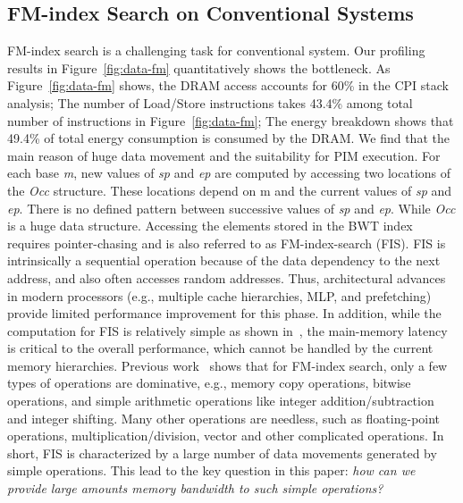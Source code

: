 \documentclass[9pt,conference]{IEEEtran}
\begin{document}
\subsection{FM-index Search on Conventional Systems}
FM-index search is a challenging task for conventional system. Our profiling results in Figure~\ref{fig:data-fm} quantitatively shows the bottleneck. As Figure~\ref{fig:data-fm} shows, the DRAM access accounts for 60\% in the CPI stack analysis; The number of Load/Store instructions takes 43.4\% among total number of instructions in Figure~\ref{fig:data-fm}; The energy breakdown shows that 49.4\% of total energy consumption is consumed by the DRAM. We find that the main reason of huge data movement and the suitability for PIM execution. For each base \textit{m}, new values of \textit{sp} and \textit{ep} are computed by accessing two locations of the \textit{Occ} structure. These locations depend on m and the current values of \textit{sp} and \textit{ep}. There is no defined pattern between successive values of \textit{sp} and \textit{ep}. While \textit{Occ} is a huge data structure. Accessing the elements stored in the BWT index requires pointer-chasing and is also referred to as FM-index-search (FIS). FIS is intrinsically a sequential operation because of the data dependency to the next address, and also often accesses random addresses. Thus, architectural advances in modern processors (e.g., multiple cache hierarchies, MLP, and prefetching) provide limited performance improvement for this phase. In addition, while the computation for FIS is relatively simple as shown in~\cite{yuanrong}, the main-memory latency is critical to the overall performance, which cannot be handled by the current memory hierarchies. Previous work~\cite{yuanrong} shows that for FM-index search, only a few types of operations are dominative, e.g., memory copy operations, bitwise operations, and simple arithmetic operations like integer addition/subtraction and integer shifting. Many other operations are needless, such as floating-point operations, multiplication/division, vector and other complicated operations. In short, FIS is characterized by a large number of data movements generated by simple operations. This lead to the key question in this paper: \textit{how can we provide large amounts memory bandwidth to such simple operations?}
\end{document}
